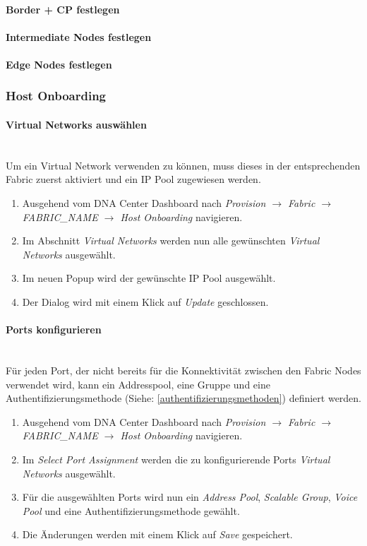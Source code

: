 \paragraph{Border + CP festlegen}
\paragraph{Intermediate Nodes festlegen}
\paragraph{Edge Nodes festlegen}

\subsubsection{Host Onboarding}

\paragraph{Virtual Networks auswählen}
~\\
Um ein Virtual Network verwenden zu können, muss dieses in der entsprechenden Fabric zuerst aktiviert und ein IP Pool zugewiesen werden. 
\begin{enumerate}
	\item Ausgehend vom DNA Center Dashboard nach \textit{Provision $\rightarrow$ Fabric $\rightarrow$ FABRIC\_NAME $\rightarrow$ Host Onboarding} navigieren. 
	\item Im Abschnitt \textit{Virtual Networks} werden nun alle gewünschten \textit{Virtual Networks} ausgewählt. 
	\item Im neuen Popup wird der gewünschte IP Pool ausgewählt. 
	\item Der Dialog wird mit einem Klick auf \textit{Update} geschlossen.
\end{enumerate}


\paragraph{Ports konfigurieren}
~\\
Für jeden Port, der nicht bereits für die Konnektivität zwischen den Fabric Nodes verwendet wird, kann ein Addresspool, eine Gruppe und eine Authentifizierungsmethode (Siehe: \ref{authentifizierungsmethoden}) definiert werden. 
\begin{enumerate}
	\item Ausgehend vom DNA Center Dashboard nach \textit{Provision $\rightarrow$ Fabric $\rightarrow$ FABRIC\_NAME $\rightarrow$ Host Onboarding} navigieren. 
	\item Im \textit{Select Port Assignment} werden die zu konfigurierende Ports \textit{Virtual Networks} ausgewählt. 
	\item Für die ausgewählten Ports wird nun ein \textit{Address Pool}, \textit{Scalable Group}, \textit{Voice Pool} und eine Authentifizierungsmethode gewählt. 
	\item Die Änderungen werden mit einem Klick auf \textit{Save} gespeichert. 
\end{enumerate}



